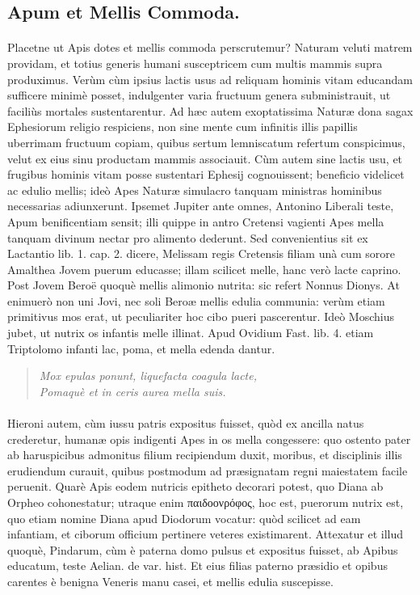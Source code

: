 \documentclass[a4paper, 11pt, oneside, polutonikogreek, latin]{article}
\begin{document}
\subsection{Apum et Mellis Commoda.}
\paragraph{}
Placetne ut Apis dotes et mellis commoda perscrutemur? Naturam veluti matrem providam, et totius generis humani susceptricem cum multis mammis supra produximus. Verùm cùm ipsius lactis usus ad reliquam hominis vitam educandam sufficere minimè posset, indulgenter varia fructuum genera subministrauit, ut faciliùs mortales sustentarentur. Ad hæc autem exoptatissima Naturæ dona sagax Ephesiorum religio respiciens, non sine mente cum infinitis illis papillis uberrimam fructuum copiam, quibus sertum lemniscatum refertum conspicimus, velut ex eius sinu productam mammis associauit. Cùm autem sine lactis usu, et frugibus hominis vitam posse sustentari Ephesij cognouissent; beneficio videlicet ac edulio mellis; ideò Apes Naturæ simulacro tanquam ministras hominibus necessarias adiunxerunt. Ipsemet Jupiter ante omnes, Antonino Liberali teste, Apum benificentiam sensit; illi quippe in antro Cretensi vagienti Apes mella tanquam divinum nectar pro alimento dederunt. Sed convenientius sit ex Lactantio lib. 1. cap. 2. dicere, Melissam regis Cretensis filiam unà cum sorore Amalthea Jovem puerum educasse; illam scilicet melle, hanc verò lacte caprino. Post Jovem Beroë quoquè mellis alimonio nutrita: sic refert Nonnus Dionys. At enimuerò non uni Jovi, nec soli Beroæ mellis edulia communia: verùm etiam primitivus mos erat, ut peculiariter hoc cibo pueri pascerentur. Ideò Moschius jubet, ut nutrix os infantis melle illinat. Apud Ovidium Fast. lib. 4. etiam Triptolomo infanti lac, poma, et mella edenda dantur.
\begin{quote}
\emph{Mox epulas ponunt, liquefacta coagula lacte,}\\
\hspace*{10mm}\emph{Pomaquè et in ceris aurea mella suis.}\\
\end{quote}
\vspace*{-8mm}
\paragraph{}
Hieroni autem, cùm iussu patris expositus fuisset, quòd ex ancilla natus crederetur, humanæ opis indigenti Apes in os mella congessere: quo ostento pater ab haruspicibus admonitus filium recipiendum duxit, moribus, et disciplinis illis erudiendum curauit, quibus postmodum ad præsignatam regni maiestatem facile peruenit. Quarè Apis eodem nutricis epitheto decorari potest, quo Diana ab Orpheo cohonestatur; utraque enim παιδοονρόφος, hoc est, puerorum nutrix est, quo etiam nomine Diana apud Diodorum vocatur: quòd scilicet ad eam infantiam, et ciborum officium pertinere veteres existimarent. Attexatur et illud quoquè, Pindarum, cùm è paterna domo pulsus et expositus fuisset, ab Apibus educatum, teste Aelian. de var. hist. Et eius filias paterno præsidio et opibus carentes è benigna Veneris manu casei, et mellis edulia suscepisse.
\end{document}
